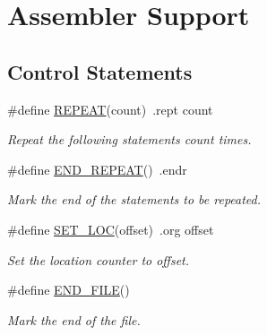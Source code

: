 \hypertarget{group__assembler__group}{\section{Assembler Support}
\label{group__assembler__group}
}
\subsection*{Control Statements}
\begin{DoxyCompactItemize}
\item 
\hypertarget{group__assembler__group_ga17f8b386ac2ef0f331bdaa4f5e21b71b}{\#define \hyperlink{group__assembler__group_ga17f8b386ac2ef0f331bdaa4f5e21b71b}{R\-E\-P\-E\-A\-T}(count)~.rept   count}\label{group__assembler__group_ga17f8b386ac2ef0f331bdaa4f5e21b71b}

\begin{DoxyCompactList}\small\item\em Repeat the following statements {\itshape count} times. \end{DoxyCompactList}\item 
\hypertarget{group__assembler__group_gaa53644ea7a4fec702079e066770eed6d}{\#define \hyperlink{group__assembler__group_gaa53644ea7a4fec702079e066770eed6d}{E\-N\-D\-\_\-\-R\-E\-P\-E\-A\-T}()~.endr}\label{group__assembler__group_gaa53644ea7a4fec702079e066770eed6d}

\begin{DoxyCompactList}\small\item\em Mark the end of the statements to be repeated. \end{DoxyCompactList}\item 
\hypertarget{group__assembler__group_ga3a8bd27aec4611e3c0d1168f092272a5}{\#define \hyperlink{group__assembler__group_ga3a8bd27aec4611e3c0d1168f092272a5}{S\-E\-T\-\_\-\-L\-O\-C}(offset)~.org    offset}\label{group__assembler__group_ga3a8bd27aec4611e3c0d1168f092272a5}

\begin{DoxyCompactList}\small\item\em Set the location counter to {\itshape offset}. \end{DoxyCompactList}\item 
\hypertarget{group__assembler__group_ga7795075d7ca3529a86ce8e60fc6f0adb}{\#define \hyperlink{group__assembler__group_ga7795075d7ca3529a86ce8e60fc6f0adb}{E\-N\-D\-\_\-\-F\-I\-L\-E}()}\label{group__assembler__group_ga7795075d7ca3529a86ce8e60fc6f0adb}

\begin{DoxyCompactList}\small\item\em Mark the end of the file. \end{DoxyCompactList}\end{DoxyCompactItemize}
